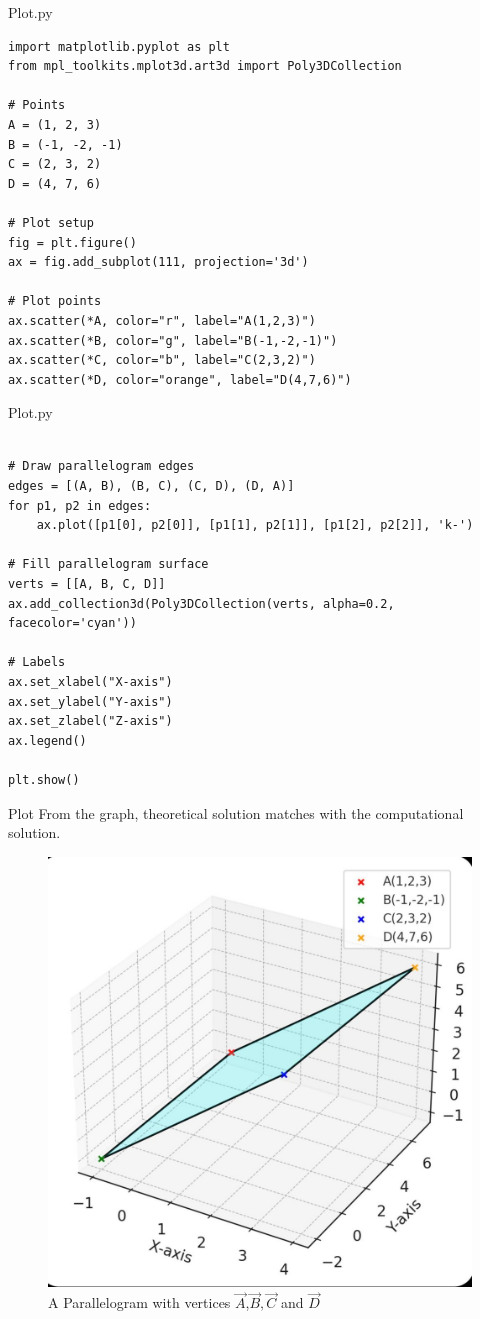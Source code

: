 \documentclass{beamer}
\begin{document}
\begin{frame}[fragile]{Plot.py}
\begin{lstlisting}
import matplotlib.pyplot as plt
from mpl_toolkits.mplot3d.art3d import Poly3DCollection

# Points
A = (1, 2, 3)
B = (-1, -2, -1)
C = (2, 3, 2)
D = (4, 7, 6)

# Plot setup
fig = plt.figure()
ax = fig.add_subplot(111, projection='3d')

# Plot points
ax.scatter(*A, color="r", label="A(1,2,3)")
ax.scatter(*B, color="g", label="B(-1,-2,-1)")
ax.scatter(*C, color="b", label="C(2,3,2)")
ax.scatter(*D, color="orange", label="D(4,7,6)")

\end{lstlisting}
\end{frame}

\begin{frame}[fragile]{Plot.py}
\begin{lstlisting}

# Draw parallelogram edges
edges = [(A, B), (B, C), (C, D), (D, A)]
for p1, p2 in edges:
    ax.plot([p1[0], p2[0]], [p1[1], p2[1]], [p1[2], p2[2]], 'k-')

# Fill parallelogram surface
verts = [[A, B, C, D]]
ax.add_collection3d(Poly3DCollection(verts, alpha=0.2, facecolor='cyan'))

# Labels
ax.set_xlabel("X-axis")
ax.set_ylabel("Y-axis")
ax.set_zlabel("Z-axis")
ax.legend()

plt.show()
\end{lstlisting}
\end{frame}
\begin{frame}{Plot}
From the graph, theoretical solution matches with the computational solution.

\begin{figure}[H]
\centering
\includegraphics[width=0.5\columnwidth]{figs/graph.png}
 \caption*{A Parallelogram with vertices $\vec{A}$,$\vec{B},\vec{C}$ and $\vec{D}$}
\label{fig:graph.png}
\end{figure}
\end{frame}
\end{document}
